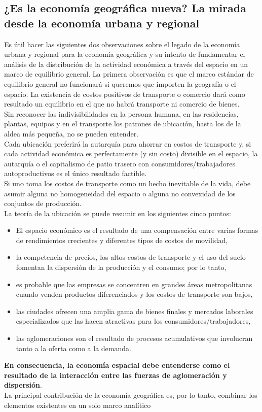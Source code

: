 \subsection{¿Es la economía geográfica nueva? La mirada desde la economía urbana y regional}
Es útil hacer las siguientes dos observaciones sobre el legado de la economía urbana y regional para la economía geográfica y su intento de fundamentar el análisis de la distribución de la actividad económica a través del espacio en un marco de equilibrio general. La primera observación es que el marco estándar de equilibrio general no funcionará si queremos que importen la geografía o el espacio. La existencia de costos positivos de transporte o comercio dará como resultado un equilibrio en el que no habrá transporte ni comercio de bienes.\\
Sin reconocer las indivisibilidades en la persona humana, en las residencias, plantas, equipos y en el transporte los patrones de ubicación, hasta los de la aldea más pequeña, no se pueden entender.\\
Cada ubicación preferirá la autarquía para ahorrar en costos de transporte y, si cada actividad económica es perfectamente (y sin costo) divisible en el espacio, la autarquía o el capitalismo de patio trasero con consumidores/trabajadores autoproductivos es el único resultado factible.\\
Si uno toma los costos de transporte como un hecho inevitable de la vida, debe asumir alguna no homogeneidad del espacio o alguna no convexidad de los conjuntos de producción.\\
La teoría de la ubicación se puede resumir en los siguientes cinco puntos:
\begin{itemize}
    \item El espacio económico es el resultado de una compensación entre varias formas de rendimientos crecientes y diferentes tipos de costos de movilidad,
    \item la competencia de precios, los altos costos de transporte y el uso del suelo fomentan la dispersión de la producción y el consumo; por lo tanto,
    \item es probable que las empresas se concentren en grandes áreas metropolitanas cuando venden productos diferenciados y los costos de transporte son bajos,
    \item las ciudades ofrecen una amplia gama de bienes finales y mercados laborales especializados que las hacen atractivas para los consumidores/trabajadores,
    \item las aglomeraciones son el resultado de procesos acumulativos que involucran tanto a la oferta como a la demanda.
\end{itemize}
\textbf{En consecuencia, la economía espacial debe entenderse como el resultado de la interacción entre las fuerzas de aglomeración y dispersión}.\\
La principal contribución de la economía geográfica es, por lo tanto, combinar los elementos existentes en un solo marco analítico

